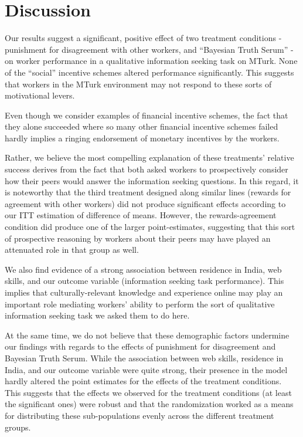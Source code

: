 \documentclass{chi2009}
\begin{document}
{\section{Discussion}

Our results suggest a significant, positive effect of two treatment
conditions - punishment for disagreement with other workers, and
``Bayesian Truth Serum'' - on worker performance in a qualitative
information seeking task on MTurk. None of the ``social'' incentive
schemes altered performance significantly. This suggests that workers
in the MTurk environment may not respond to these sorts of
motivational levers.

Even though we consider examples of financial incentive schemes, the
fact that they alone succeeded where so many other financial incentive
schemes failed hardly implies a ringing endorsement of monetary
incentives by the workers.

Rather, we believe the most compelling explanation of these
treatments' relative success derives from the fact that both asked
workers to prospectively consider how their peers would answer the
information seeking questions. In this regard, it is noteworthy that
the third treatment designed along similar lines (rewards for
agreement with other workers) did not produce significant effects
according to our ITT estimation of difference of means. However, the
rewards-agreement condition did produce one of the larger
point-estimates, suggesting that this sort of prospective reasoning by
workers about their peers may have played an attenuated role in that
group as well.

We also find evidence of a strong association between residence in
India, web skills, and our outcome variable (information seeking task
performance). This implies that culturally-relevant knowledge and
experience online may play an important role mediating workers'
ability to perform the sort of qualitative information seeking task we
asked them to do here.

At the same time, we do not believe that these demographic factors
undermine our findings with regards to the effects of punishment for
disagreement and Bayesian Truth Serum. While the association between
web skills, residence in India, and our outcome variable were quite
strong, their presence in the model hardly altered the point estimates
for the effects of the treatment conditions. This suggests that the
effects we observed for the treatment conditions (at least the
significant ones) were robust and that the randomization worked as a
means for distributing these sub-populations evenly across the
different treatment groups.


}
\end{document}
